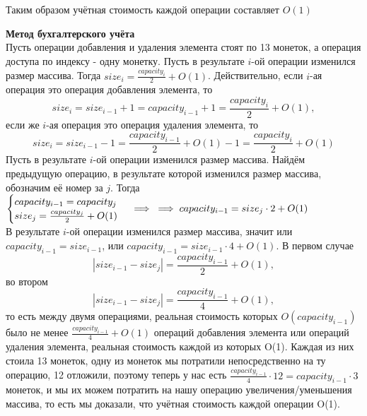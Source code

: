 \documentclass{article}
\newcommand{\ci}[1][i]{capacity_{#1}}
\newcommand{\cpi}{\ci[i-1]}
\newcommand{\si}[1][i]{size_{#1}}
\newcommand{\spi}{\si[i-1]}
\newcommand{\cj}{\ci[j]}
\newcommand{\sj}{\si[j]}
\begin{document}
	Таким образом учётная стоимость каждой операции составляет $O(1)$
	
\newpage
\textbf{Метод бухгалтерского учёта}\\
	Пусть операции добавления и удаления элемента стоят по 13 монеток, а операция доступа по индексу - одну монетку. Пусть в результате $i$-ой операции изменился размер массива. Тогда $\si=\frac{\ci}{2}+O(1)$. Действительно, если $i$-ая операция это операция добавления элемента, то $$\si=\spi+1=\cpi+1=\frac{\ci}{2}+O(1),$$
	если же $i$-ая операция это операция удаления элемента, то $$\si=\spi-1=\frac{\cpi}{2}+O(1)-1=\frac{\ci}{2}+O(1)$$
	Пусть в результате $i$-ой операции изменился размер массива. Найдём предыдущую операцию, в результате которой изменился размер массива, обозначим её номер за $j$. Тогда\\
	$\begin{cases}
	\cpi=\cj\\
	\si[j]=\frac{\cj}{2}+O(1)
	\end{cases} \implies\\
	\implies \cpi=\sj\cdot2+O(1)$\\
	В результате $i$-ой операции изменился размер массива, значит или $\cpi=\spi$, или $\cpi=\spi\cdot4+O(1)$. В первом случае
	$$|\spi-\sj|=\frac{\cpi}{2}+O(1),$$
	во втором
	$$|\spi-\sj|=\frac{\cpi}{4}+O(1),$$
	то есть между двумя операциями, реальная стоимость которых $O(\cpi)$ было не менее $\frac{\cpi}{4}+O(1)$ операций добавления элемента или операций удаления элемента, реальная стоимость каждой из которых O(1). Каждая из них стоила 13 монеток, одну из монеток мы потратили непосредственно на ту операцию, 12 отложили, поэтому теперь у нас есть $\frac{\cpi}{4}\cdot12=\cpi\cdot3$ монеток, и мы их можем потратить на нашу операцию увеличения/уменьшения массива, то есть мы доказали, что учётная стоимость каждой операции O(1).
	
\end{document}
